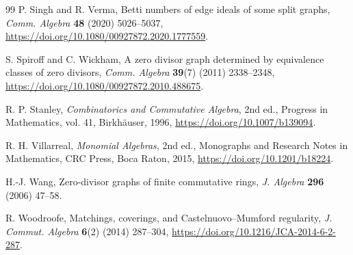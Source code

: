 \documentclass[12pt]{article}
\theoremstyle{definition}
\begin{document}
\begin{thebibliography}{99}
P. Singh and R. Verma,
Betti numbers of edge ideals of some split graphs,
\emph{Comm. Algebra} \textbf{48} (2020) 5026--5037,
\url{https://doi.org/10.1080/00927872.2020.1777559}.

S. Spiroff and C. Wickham,
A zero divisor graph determined by equivalence classes of zero divisors,
\emph{Comm. Algebra} \textbf{39}(7) (2011) 2338--2348,
\url{https://doi.org/10.1080/00927872.2010.488675}.

R. P. Stanley,
\emph{Combinatorics and Commutative Algebra}, 2nd ed.,
Progress in Mathematics, vol. 41, Birkhäuser, 1996,
\url{https://doi.org/10.1007/b139094}.

R. H. Villarreal,
\emph{Monomial Algebras}, 2nd ed.,
Monographs and Research Notes in Mathematics, CRC Press, Boca Raton, 2015,
\url{https://doi.org/10.1201/b18224}.

H.-J. Wang,
Zero-divisor graphs of finite commutative rings,
\emph{J. Algebra} \textbf{296} (2006) 47--58.

R. Woodroofe,
Matchings, coverings, and Castelnuovo--Mumford regularity,
\emph{J. Commut. Algebra} \textbf{6}(2) (2014) 287--304,
\url{https://doi.org/10.1216/JCA-2014-6-2-287}.

\end{thebibliography}
\end{document}
